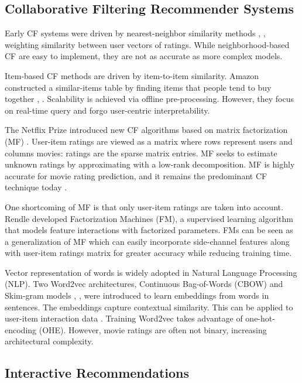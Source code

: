 \subsection{Collaborative Filtering Recommender Systems}

Early CF systems were driven by nearest-neighbor similarity methods \cite{herlocker1999algorithmic}, \cite{smith2017two}, weighting similarity between user vectors of ratings. While neighborhood-based CF are easy to implement, they are not as accurate as more complex models.

Item-based CF methods are driven by item-to-item similarity. Amazon constructed a similar-items table by finding items that people tend to buy together \cite{linden2003amazon}, \cite{smith2017two}. Scalability is achieved via offline pre-processing. However, they focus on real-time query and forgo user-centric interpretability. 

The Netflix Prize introduced new CF algorithms based on matrix factorization (MF) \cite{funk2006netflix}. User-item ratings are viewed as a matrix where rows represent users and columns movies: ratings are the sparse matrix entries. MF seeks to estimate unknown ratings by approximating with a low-rank decomposition. MF is highly accurate for movie rating prediction, and it remains the predominant CF technique today \cite{koren2008factorization}. 

One shortcoming of MF is that only user-item ratings are taken into account. Rendle \cite{rendle2012factorization} developed Factorization Machines (FM), a supervised learning algorithm that models feature interactions with factorized parameters.  FMs can be seen as a generalization of MF which can easily incorporate side-channel features along with user-item ratings matrix for greater accuracy while reducing training time.

Vector representation of words is widely adopted in Natural Language Processing (NLP). Two Word2vec architectures, Continuous Bag-of-Words (CBOW) and Skim-gram models \cite{mikolov2013efficient},  \cite{mikolov2013distributed}, \cite{rong2014word2vec} were introduced to learn embeddings from words in sentences. The embeddings capture contextual similarity. This can be applied to user-item interaction data \cite{ozsoy2016word}. Training Word2vec takes advantage of one-hot-encoding (OHE). However, movie ratings are often not binary, increasing architectural complexity.

\subsection{Interactive Recommendations}

